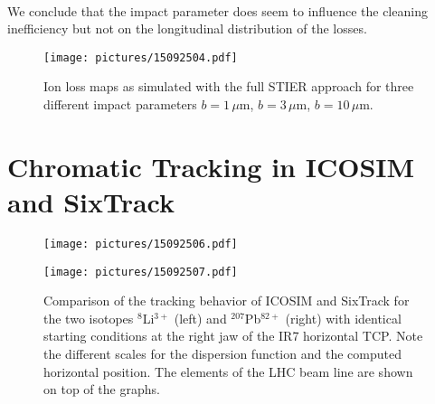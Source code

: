 {\\
We conclude that the impact parameter does seem to influence the cleaning inefficiency but not on the longitudinal distribution of the losses. }



\begin{figure}[t]
  \begin{center}
\texttt{[image: pictures/15092504.pdf]}
\caption{Ion loss maps as simulated with the full STIER approach for three different impact parameters \mbox{$b=1\,\mu$m}, \mbox{$b=3\,\mu$m}, \mbox{$b=10\,\mu$m}.}
\label{fig:15062502.pdf}
  \end{center}
\end{figure}

\section{Chromatic Tracking in ICOSIM and SixTrack}
\begin{figure*}[t]
\begin{minipage}[t]{0.49\textwidth}
\texttt{[image: pictures/15092506.pdf]}
\end{minipage}
\begin{minipage}[t]{0.49\textwidth}
\texttt{[image: pictures/15092507.pdf]}
\end{minipage}
\caption{Comparison of the tracking behavior of ICOSIM and SixTrack for the two isotopes $^{8}$Li$^{3+}$ (left) and $^{207}$Pb$^{82+}$ (right) with identical starting conditions at the right jaw of the IR7 horizontal TCP. Note the different scales for the dispersion function and the computed horizontal position. The elements of the LHC beam line are shown on top of the graphs. }
\label{fig:15032202.pdf}
\end{figure*}



